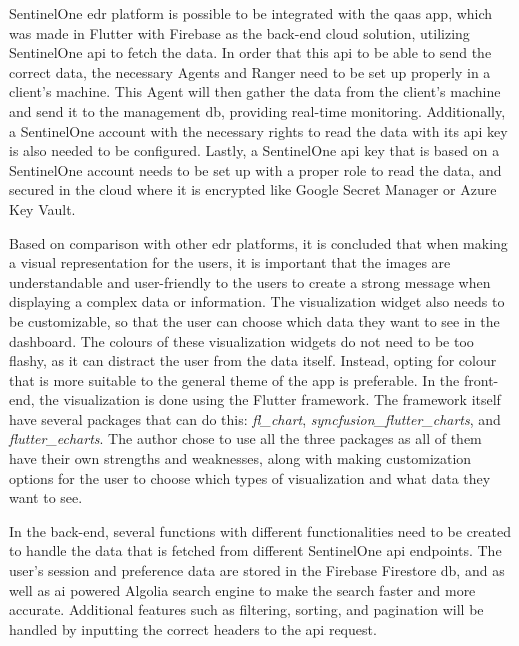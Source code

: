 \begin{multicols}{2}
  SentinelOne \acrshort{edr} platform is possible to be integrated with the \acrshort{qaas} app, which was made in Flutter with
  Firebase as the back-end cloud solution, utilizing SentinelOne \acrshort{api} to fetch the data. In order that this \acrshort{api}
  to be able to send the correct data, the necessary Agents and Ranger need to be set up properly in a client's machine. This Agent will
  then gather the data from the client's machine and send it to the management \acrshort{db}, providing real-time monitoring. Additionally,
  a SentinelOne account with the necessary rights to read the data with its \acrshort{api} key is also needed to be configured. Lastly, a
  SentinelOne \acrshort{api} key that is based on a SentinelOne account needs to be set up with a proper role to read the data, and secured
  in  the cloud where it is encrypted like Google Secret Manager or Azure Key Vault.

  Based on comparison with other \acrshort{edr} platforms, it is concluded that when making a visual representation for the users, it is
  important that the images are understandable and user-friendly to the users to create a strong message when displaying a complex data
  or information. The visualization widget also needs to be customizable, so that the user can choose which data they want to see in the
  dashboard. The colours of these visualization widgets do not need to be too flashy, as it can distract the user from the data itself. Instead,
  opting for colour that is more suitable to the general theme of the app is preferable. In the front-end, the visualization is done using the
  Flutter framework. The framework itself have several packages that can do this: \textit{fl\_chart}, \textit{syncfusion\_flutter\_charts},
  and \textit{flutter\_echarts}. The author chose to use all the three packages as all of them have their own strengths and weaknesses, along
  with making customization options for the user to choose which types of visualization and what data they want to see.

  In the back-end, several functions with different functionalities need to be created to handle the data that is fetched from different
  SentinelOne \acrshort{api} endpoints. The user's session and preference data are stored in the Firebase Firestore \acrshort{db}, and as
  well as \acrshort{ai} powered Algolia search engine to make the search faster and more accurate. Additional features such as filtering,
  sorting, and pagination will be handled by inputting the correct headers to the \acrshort{api} request.


\end{multicols}
